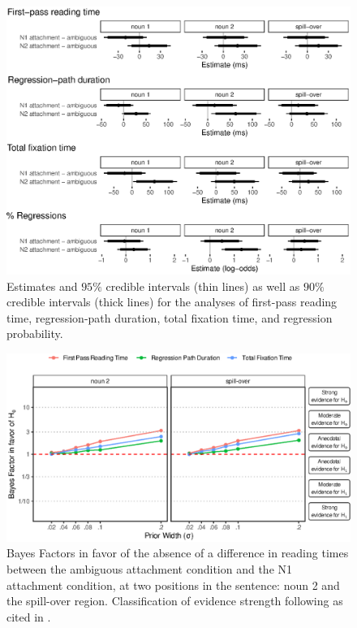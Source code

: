 \documentclass[english, doc]{apa7}\usepackage[]{graphicx}\usepackage[]{color}
\makeatletter
\def\maxwidth{ %
  \ifdim\Gin@nat@width>\linewidth
    \linewidth
  \else
    \Gin@nat@width
  \fi
}
\makeatother
\begin{document}
\begin{figure}
\includegraphics[width=\maxwidth]{figure/emStandardMeasuresModelCoefPlot.eps} 
\caption{Estimates and $95\%$ credible intervals (thin lines) as well as $90\%$ credible intervals (thick lines)  for the analyses of first-pass reading time, regression-path duration, total fixation time, and regression probability.}
\label{fig:emStandardMeasuresModelCoefPlot}
\end{figure}


\begin{figure}
\includegraphics[width=\maxwidth]{./figure/exp1_BFs.eps} 
\caption{Bayes Factors in favor of the absence of a difference in reading times between the ambiguous attachment condition and the N1 attachment condition, at two positions in the sentence: noun 2 and the spill-over region. Classification of evidence strength following \citet{Jeffreys:1961} as cited in \protect\citet{LeeWagenmakers:2014}. }
\label{fig:EyeBFs1}
\end{figure}
\end{document}
